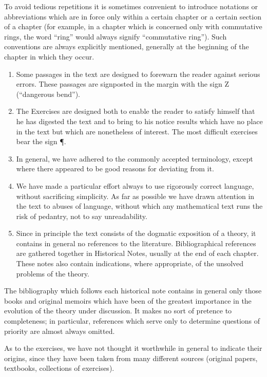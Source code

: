To avoid tedious repetitions it is sometimes convenient to introduce notations or abbreviations which are in force only within a certain chapter or a certain section of a chapter (for example, in a chapter which is concerned only with commutative rings, the word ``ring'' would always signify ``commutative ring''). Such conventions are always explicitly mentioned, generally at the beginning of the chapter in which they occur.

\begin{enumerate}
\def\labelenumi{\arabic{enumi}.}
\setcounter{enumi}{5}
\item
  Some passages in the text are designed to forewarn the reader against serious errors. These passages are signposted in the margin with the sign Z (``dangerous bend'').
\item
  The Exercises are designed both to enable the reader to satisfy himself that he has digested the text and to bring to his notice results which have no place in the text but which are nonetheless of interest. The most difficult exercises bear the sign ¶.
\item
  In general, we have adhered to the commonly accepted terminology, except where there appeared to be good reasons for deviating from it.
\item
  We have made a particular effort always to use rigorously correct language, without sacrificing simplicity. As far as possible we have drawn attention in the text to abuses of language, without which any mathematical text runs the risk of pedantry, not to say unreadability.
\item
  Since in principle the text consists of the dogmatic exposition of a theory, it contains in general no references to the literature. Bibliographical references are gathered together in Historical Notes, usually at the end of each chapter. These notes also contain indications, where appropriate, of the unsolved problems of the theory.
\end{enumerate}

The bibliography which follows each historical note contains in general only those books and original memoirs which have been of the greatest importance in the evolution of the theory under discussion. It makes no sort of pretence to completeness; in particular, references which serve only to determine questions of priority are almost always omitted.

As to the exercises, we have not thought it worthwhile in general to indicate their origins, since they have been taken from many different sources (original papers, textbooks, collections of exercises).

